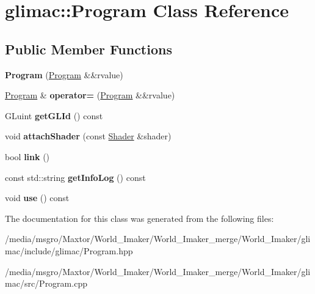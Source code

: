 \hypertarget{classglimac_1_1Program}{}\section{glimac\+:\+:Program Class Reference}
\label{classglimac_1_1Program}
\subsection*{Public Member Functions}
\begin{DoxyCompactItemize}
\item 
\mbox{\label{classglimac_1_1Program_aad59ed1f53824eda09b95fd1acdce674}} 
{\bfseries Program} (\hyperlink{classglimac_1_1Program}{Program} \&\&rvalue)
\item 
\mbox{\label{classglimac_1_1Program_a3ee1eac00a2e3fa4b6bab51d4333f33c}} 
\hyperlink{classglimac_1_1Program}{Program} \& {\bfseries operator=} (\hyperlink{classglimac_1_1Program}{Program} \&\&rvalue)
\item 
\mbox{\label{classglimac_1_1Program_ab1a519d005c77ba44876d1f309b38d18}} 
G\+Luint {\bfseries get\+G\+L\+Id} () const
\item 
\mbox{\label{classglimac_1_1Program_a5aac165d28cd6f704c01a3e0eee2119d}} 
void {\bfseries attach\+Shader} (const \hyperlink{classglimac_1_1Shader}{Shader} \&shader)
\item 
\mbox{\label{classglimac_1_1Program_a2f32f4f66ff9742750418f6fda054931}} 
bool {\bfseries link} ()
\item 
\mbox{\label{classglimac_1_1Program_aaf1769457ca41bca4afad7ecf90e9c3f}} 
const std\+::string {\bfseries get\+Info\+Log} () const
\item 
\mbox{\label{classglimac_1_1Program_a825cb4d58cccdf849730191ae5e118c6}} 
void {\bfseries use} () const
\end{DoxyCompactItemize}


The documentation for this class was generated from the following files\+:\begin{DoxyCompactItemize}
\item 
/media/msgro/\+Maxtor/\+World\+\_\+\+Imaker/\+World\+\_\+\+Imaker\+\_\+merge/\+World\+\_\+\+Imaker/glimac/include/glimac/Program.\+hpp\item 
/media/msgro/\+Maxtor/\+World\+\_\+\+Imaker/\+World\+\_\+\+Imaker\+\_\+merge/\+World\+\_\+\+Imaker/glimac/src/Program.\+cpp\end{DoxyCompactItemize}
